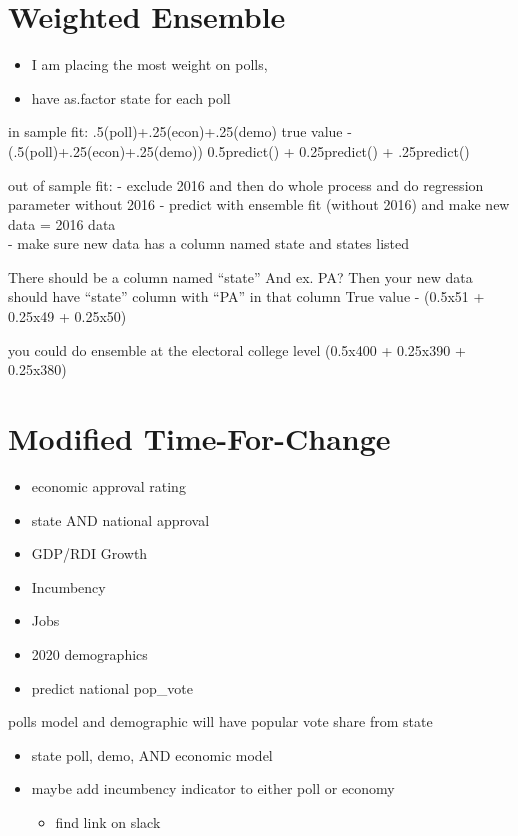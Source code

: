 \documentclass[
]{article}
\providecommand{\tightlist}{%
  \setlength{\itemsep}{0pt}\setlength{\parskip}{0pt}}
\begin{document}
\hypertarget{weighted-ensemble}{%
\section{Weighted Ensemble}\label{weighted-ensemble}}

\begin{itemize}
\tightlist
\item
  I am placing the most weight on polls,
\item
  have as.factor state for each poll
\end{itemize}

in sample fit: .5(poll)+.25(econ)+.25(demo) true value -
(.5(poll)+.25(econ)+.25(demo)) 0.5predict() + 0.25predict() +
.25predict()

out of sample fit: - exclude 2016 and then do whole process and do
regression parameter without 2016 - predict with ensemble fit (without
2016) and make new data = 2016 data\\
- make sure new data has a column named state and states listed

There should be a column named ``state'' And ex. PA? Then your new data
should have ``state'' column with ``PA'' in that column True value -
(0.5x51 + 0.25x49 + 0.25x50)

you could do ensemble at the electoral college level (0.5x400 + 0.25x390
+ 0.25x380)

\hypertarget{modified-time-for-change}{%
\section{Modified Time-For-Change}\label{modified-time-for-change}}

\begin{itemize}
\tightlist
\item
  economic approval rating
\item
  state AND national approval
\item
  GDP/RDI Growth
\item
  Incumbency
\item
  Jobs
\item
  2020 demographics
\item
  predict national pop\_vote
\end{itemize}

polls model and demographic will have popular vote share from state

\begin{itemize}
\tightlist
\item
  state poll, demo, AND economic model
\item
  maybe add incumbency indicator to either poll or economy

  \begin{itemize}
  \tightlist
  \item
    find link on slack
  \end{itemize}
\end{itemize}
\end{document}
